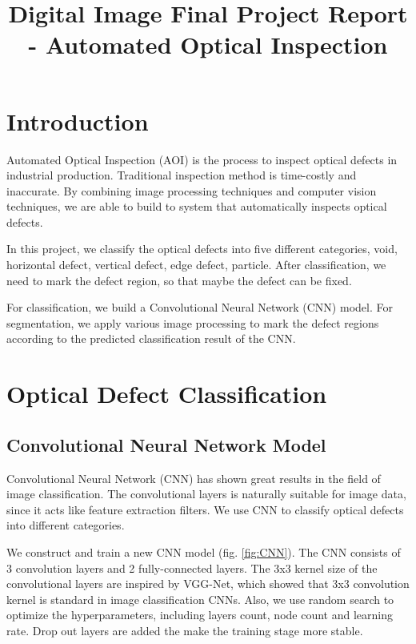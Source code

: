 \documentclass[conference]{IEEEtran}
\begin{document}
\begin{CJK}{UTF8}{bsmi}
\lstset{language=Python} 

\title{Digital Image Final Project Report - Automated Optical Inspection}

\author{
}

\maketitle

\section{Introduction}
Automated Optical Inspection (AOI) is the process to inspect optical defects in industrial production. Traditional inspection method is time-costly and inaccurate. By combining image processing techniques and computer vision techniques, we are able to build to system that automatically inspects optical defects.

In this project, we classify the optical defects into five different categories, void, horizontal defect, vertical defect, edge defect, particle. After classification, we need to mark the defect region, so that maybe the defect can be fixed.

For classification, we build a Convolutional Neural Network (CNN) model. For segmentation, we apply various image processing to mark the defect regions according to the predicted classification result of the CNN.

\section{Optical Defect Classification}

\subsection{Convolutional Neural Network Model}
Convolutional Neural Network (CNN) has shown great results in the field of image classification. The convolutional layers is naturally suitable for image data, since it acts like feature extraction filters. We use CNN to classify optical defects into different categories.

We construct and train a new CNN model (fig. \ref{fig:CNN}). The CNN consists of 3 convolution layers and 2 fully-connected layers. The 3x3 kernel size of the convolutional layers are inspired by VGG-Net\cite{VGG}, which showed that 3x3 convolution kernel is standard in image classification CNNs. Also, we use random search to optimize the hyperparameters, including layers count, node count and learning rate. Drop out layers are added the make the training stage more stable.


\end{CJK}
\end{document}

